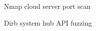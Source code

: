 \documentclass{article}
\begin{document}
\begin{figure}[!htb]
	\caption{Nmap cloud server port scan}
\end{figure}

\begin{figure}[!htb]
	\caption{Dirb system hub API fuzzing}
\end{figure}
\end{document}
